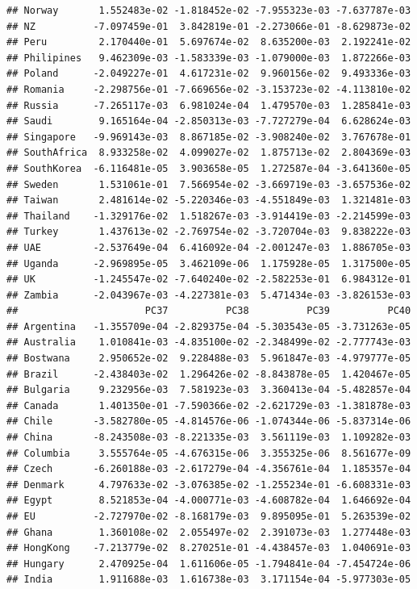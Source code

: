\documentclass[11pt,preprint, authoryear]{elsarticle}
\numberwithin{equation}{section}
\numberwithin{figure}{section}
\numberwithin{table}{section}
\begin{document}
\begin{verbatim}
## Norway       1.552483e-02 -1.818452e-02 -7.955323e-03 -7.637787e-03
## NZ          -7.097459e-01  3.842819e-01 -2.273066e-01 -8.629873e-02
## Peru         2.170440e-01  5.697674e-02  8.635200e-03  2.192241e-02
## Philipines   9.462309e-03 -1.583339e-03 -1.079000e-03  1.872266e-03
## Poland      -2.049227e-01  4.617231e-02  9.960156e-02  9.493336e-03
## Romania     -2.298756e-01 -7.669656e-02 -3.153723e-02 -4.113810e-02
## Russia      -7.265117e-03  6.981024e-04  1.479570e-03  1.285841e-03
## Saudi        9.165164e-04 -2.850313e-03 -7.727279e-04  6.628624e-03
## Singapore   -9.969143e-03  8.867185e-02 -3.908240e-02  3.767678e-01
## SouthAfrica  8.933258e-02  4.099027e-02  1.875713e-02  2.804369e-03
## SouthKorea  -6.116481e-05  3.903658e-05  1.272587e-04 -3.641360e-05
## Sweden       1.531061e-01  7.566954e-02 -3.669719e-03 -3.657536e-02
## Taiwan       2.481614e-02 -5.220346e-03 -4.551849e-03  1.321481e-03
## Thailand    -1.329176e-02  1.518267e-03 -3.914419e-03 -2.214599e-03
## Turkey       1.437613e-02 -2.769754e-02 -3.720704e-03  9.838222e-03
## UAE         -2.537649e-04  6.416092e-04 -2.001247e-03  1.886705e-03
## Uganda      -2.969895e-05  3.462109e-06  1.175928e-05  1.317500e-05
## UK          -1.245547e-02 -7.640240e-02 -2.582253e-01  6.984312e-01
## Zambia      -2.043967e-03 -4.227381e-03  5.471434e-03 -3.826153e-03
##                      PC37          PC38          PC39          PC40
## Argentina   -1.355709e-04 -2.829375e-04 -5.303543e-05 -3.731263e-05
## Australia    1.010841e-03 -4.835100e-02 -2.348499e-02 -2.777743e-03
## Bostwana     2.950652e-02  9.228488e-03  5.961847e-03 -4.979777e-05
## Brazil      -2.438403e-02  1.296426e-02 -8.843878e-05  1.420467e-05
## Bulgaria     9.232956e-03  7.581923e-03  3.360413e-04 -5.482857e-04
## Canada       1.401350e-01 -7.590366e-02 -2.621729e-03 -1.381878e-03
## Chile       -3.582780e-05 -4.814576e-06 -1.074344e-06 -5.837314e-06
## China       -8.243508e-03 -8.221335e-03  3.561119e-03  1.109282e-03
## Columbia     3.555764e-05 -4.676315e-06  3.355325e-06  8.561677e-09
## Czech       -6.260188e-03 -2.617279e-04 -4.356761e-04  1.185357e-04
## Denmark      4.797633e-02 -3.076385e-02 -1.255234e-01 -6.608331e-03
## Egypt        8.521853e-04 -4.000771e-03 -4.608782e-04  1.646692e-04
## EU          -2.727970e-02 -8.168179e-03  9.895095e-01  5.263539e-02
## Ghana        1.360108e-02  2.055497e-02  2.391073e-03  1.277448e-03
## HongKong    -7.213779e-02  8.270251e-01 -4.438457e-03  1.040691e-03
## Hungary      2.470925e-04  1.611606e-05 -1.794841e-04 -7.454724e-06
## India        1.911688e-03  1.616738e-03  3.171154e-04 -5.977303e-05

\end{verbatim}
\end{document}

